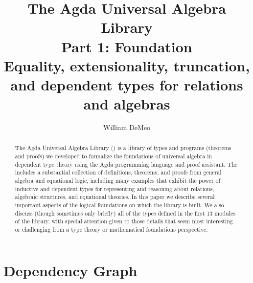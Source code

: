 \documentclass[a4paper,UKenglish,cleveref,autoref,thm-restate,12pt]{../lipics-v2021-wjd}
\title{The Agda Universal Algebra Library\\%
Part 1: Foundation\\[-5pt]
{\large Equality, extensionality, truncation, and dependent types for relations and algebras} }%
\author{William DeMeo}
       {Department of Algebra, Charles University in Prague \and \url{https://williamdemeo.gitlab.io}}
       {williamdemeo@gmail.com}{https://orcid.org/0000-0003-1832-5690}{}
\begin{document}
\maketitle


\begin{abstract}
The Agda Universal Algebra Library (\ualib) is a library of types and programs (theorems and proofs) we developed to formalize the foundations of universal algebra in dependent type theory using the Agda programming language and proof assistant. The \ualib includes a substantial collection of definitions, theorems, and proofs from general algebra and equational logic, including many examples that exhibit the power of inductive and dependent types for representing and reasoning about relations, algebraic structures, and equational theories. In this paper we describe several important aspects of the logical foundations on which the library is built. We also discuss (though sometimes only briefly) all of the types defined in the first 13 modules of the library, with special attention given to those details that seem most interesting or challenging from a type theory or mathematical foundations perspective.
\end{abstract}



\newpage %

\setcounter{tocdepth}{2}
\tableofcontents








% 
% 
% 
% 
% 








\appendix

\newpage


% 

\section{Dependency Graph}
\end{document}
